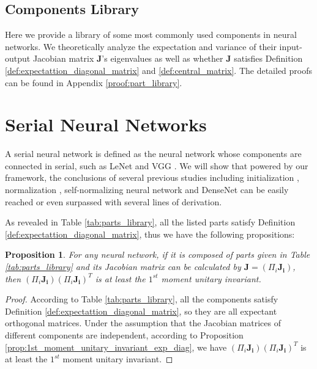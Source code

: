 \documentclass[10pt,journal,compsoc]{IEEEtran}
\newcommand{\modify}[1]{{ #1}}
\newtheorem{prop}{Proposition}[section]
\begin{document}
\subsection{Components Library}\label{sec:parts_library}
Here we provide a library of some most commonly used components in neural networks. We theoretically analyze the expectation and variance of their input-output Jacobian matrix $\mathbf{J}$'s eigenvalues as well as whether $\mathbf{J}$ satisfies Definition \ref{def:expectattion_diagonal_matrix} and \ref{def:central_matrix}. \modify{The detailed proofs can be found in Appendix \ref{proof:part_library}}.
 
\section{Serial Neural Networks}
A serial neural network is defined as the neural network whose components are connected in serial, such as LeNet \cite{lecun1998gradient} and VGG \cite{simonyan2014very}. We will show that powered by our framework, \modify{the conclusions of several previous studies including initialization \cite{he2015delving,xiao2018dynamical}, normalization \cite{salimans2016weight,arpit2016normalization,ioffe2015batch}, self-normalizing neural network \cite{klambauer2017self} and DenseNet\cite{huang2017densely} can be easily reached or even surpassed with several lines of derivation.}

As revealed in Table \ref{tab:parts_library}, all the listed parts satisfy Definition \ref{def:expectattion_diagonal_matrix}, thus we have the following propositions:
\begin{prop}
For any neural network, if it is composed of parts given in Table \ref{tab:parts_library} and its Jacobian matrix can be calculated by $\mathbf{J} = (\Pi_i\mathbf{J_i})$, then $(\Pi_i\mathbf{J_i})(\Pi_i\mathbf{J_i})^T$ is at least the $1^{st}$ moment unitary invariant.
\label{prop:prerequisite_series_networks}
\end{prop}
\begin{proof}
According to Table \ref{tab:parts_library}, all the components satisfy Definition \ref{def:expectattion_diagonal_matrix}, so they are all expectant orthogonal matrices. Under the assumption that the Jacobian matrices of different components are independent, according to Proposition \ref{prop:1st_moment_unitary_invariant_exp_diag}, we have $(\Pi_i\mathbf{J_i})(\Pi_i\mathbf{J_i})^T$ is at least the $1^{st}$ moment unitary invariant.
\end{proof}
\end{document}
